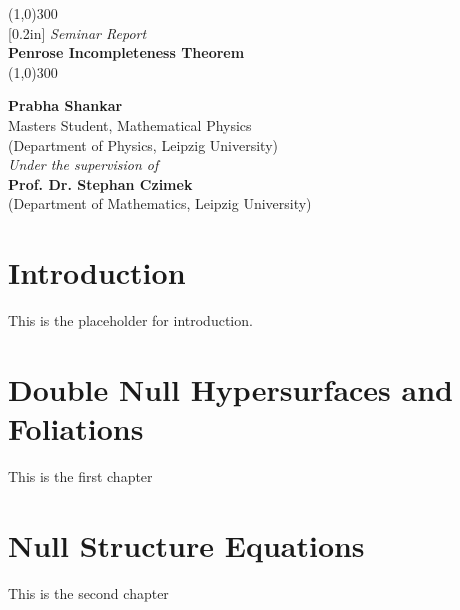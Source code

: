 \documentclass[12pt, a4paper]{report}
\theoremstyle{bfnote}
\begin{document}
\begin{titlepage}
    \begin{center}
    \line(1,0){300}\\
    [0.2in]
    \normalsize{\emph {Seminar Report}}\\	
    \Huge{\bfseries Penrose Incompleteness Theorem}\\
    [-0.12in]
    \line(1,0){300}\\
    
    \vspace{3in}
    
    \LARGE{\bfseries {Prabha Shankar}}\\
    \small{Masters Student, Mathematical Physics}\\
    \small{(Department of Physics, Leipzig University)}\\
    
    \vspace{3cm}
    \normalsize{\emph {Under the supervision of}}\\
    \large{\bfseries {Prof. Dr. Stephan Czimek}}\\
    \small{(Department of Mathematics, Leipzig University)}\\
    
    \end{center}
\end{titlepage}

\section*{Introduction}
This is the placeholder for introduction.

\section{Double Null Hypersurfaces and Foliations}
This is the first chapter

\section{Null Structure Equations}
This is the second chapter 
\end{document}
